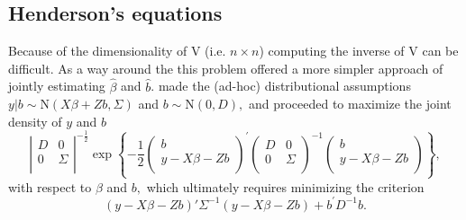 \documentclass[12pt, a4paper]{report}
\theoremstyle{plain}
\theoremstyle{definition}
\theoremstyle{remark}
\begin{document}
	
	
	
	
	
	
	
	
	
	
	
	
	
	
	
	
	
	
	
	
	

	\subsection{Henderson's equations}
	Because of the dimensionality of V (i.e. $n \times n$) computing the inverse of V can be difficult. As a way around the this problem \citet{Henderson53, Henderson59,Henderson63,Henderson73,Henderson84a} offered a more simpler approach of jointly estimating $\hat{\beta}$ and $\hat{b}$.
	\cite{Henderson:1950} made the (ad-hoc) distributional assumptions $y|b \sim \mathrm{N} (X \beta + Zb, \Sigma)$ and $b \sim \mathrm{N}(0,D),$ and proceeded to maximize the joint density of $y$ and $b$
	\begin{equation}
	\left|
	\begin{array}{cc}
	D & 0 \\
	0 & \Sigma \\
	\end{array}
	\right|^{-\frac{1}{2}}
	\exp
	\left\{ -\frac{1}{2}
	\left(
	\begin{array}{c}
	b \\
	y - X \beta -Zb \\
	\end{array}
	\right)^\prime
	\left( \begin{array}{cc}
	D & 0 \\
	0 & \Sigma \\
	\end{array}\right)^{-1}
	\left(
	\begin{array}{c}
	b \\
	y - X \beta -Zb \\
	\end{array}
	\right)
	\right\},
	\label{u&beta:JointDensity}
	\end{equation}
	with respect to $\beta$ and $b,$ which ultimately requires minimizing the criterion
	\begin{equation}
	(y - X \beta -Zb)'\Sigma^{-1}(y - X \beta -Zb) + b^\prime D^{-1}b.
	\label{Henderson:Criterion}
	\end{equation}
\end{document}
